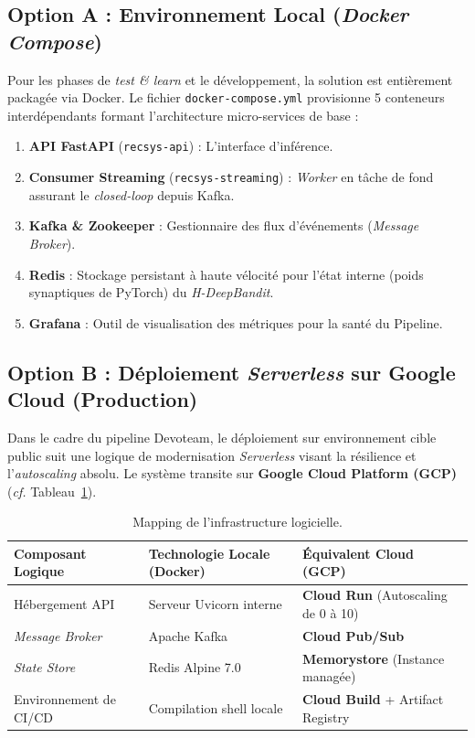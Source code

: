\subsection{Option A : Environnement Local (\textit{Docker Compose})}
Pour les phases de \textit{test \& learn} et le développement, la solution est entièrement packagée via Docker. Le fichier \texttt{docker-compose.yml} provisionne 5 conteneurs interdépendants formant l'architecture micro-services de base :
\begin{enumerate}
    \item \textbf{API FastAPI} (\texttt{recsys-api}) : L'interface d'inférence.
    \item \textbf{Consumer Streaming} (\texttt{recsys-streaming}) : \textit{Worker} en tâche de fond assurant le \textit{closed-loop} depuis Kafka.
    \item \textbf{Kafka \& Zookeeper} : Gestionnaire des flux d'événements (\textit{Message Broker}).
    \item \textbf{Redis} : Stockage persistant à haute vélocité pour l'état interne (poids synaptiques de PyTorch) du \textit{H-DeepBandit}.
    \item \textbf{Grafana} : Outil de visualisation des métriques pour la santé du Pipeline.
\end{enumerate}

\subsection{Option B : Déploiement \textit{Serverless} sur Google Cloud (Production)}

Dans le cadre du pipeline Devoteam, le déploiement sur environnement cible public suit une logique de modernisation \textit{Serverless} visant la résilience et l'\textit{autoscaling} absolu. Le système transite sur \textbf{Google Cloud Platform (GCP)} (\textit{cf.} Tableau~\ref{tab:mapping_infra}).

\begin{table}[H]
    \centering
    \begin{tabular}{l l l}
        \toprule
        \textbf{Composant Logique} & \textbf{Technologie Locale (Docker)} & \textbf{Équivalent Cloud (GCP)} \\
        \midrule
        Hébergement API & Serveur Uvicorn interne & \textbf{Cloud Run} (Autoscaling de 0 à 10) \\
        \textit{Message Broker} & Apache Kafka & \textbf{Cloud Pub/Sub} \\
        \textit{State Store} & Redis Alpine 7.0 & \textbf{Memorystore} (Instance managée) \\
        Environnement de CI/CD & Compilation shell locale & \textbf{Cloud Build} + Artifact Registry \\
        \bottomrule
    \end{tabular}
    \caption{Mapping de l'infrastructure logicielle.}
    \label{tab:mapping_infra}
\end{table}

